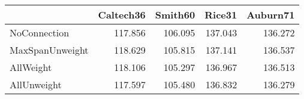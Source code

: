 \begin{tabular}{lrrrr}
\toprule
{} & Caltech36 & Smith60 &  Rice31 & Auburn71 \\
\midrule
NoConnection    &   117.856 & 106.095 & 137.043 &  136.272 \\
MaxSpanUnweight &   118.629 & 105.815 & 137.141 &  136.537 \\
AllWeight       &   118.106 & 105.297 & 136.967 &  136.513 \\
AllUnweight     &   117.597 & 105.480 & 136.832 &  136.279 \\
\bottomrule
\end{tabular}
